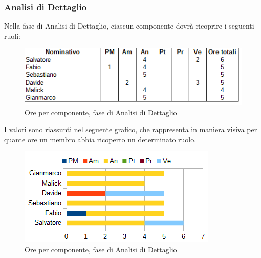 		\subsubsection{Analisi di Dettaglio}
		Nella fase di Analisi di Dettaglio, ciascun componente dovrà ricoprire i seguenti ruoli: \\
		\begin{figure}[H]
			\centering
			\includegraphics[scale=0.75]{immagini/tabelle/analisi_dettaglio.png}
			\caption{Ore per componente, fase di Analisi di Dettaglio}
		\end{figure}
		I valori sono riassunti nel seguente grafico, che rappresenta in maniera visiva per quante ore un membro abbia ricoperto un determinato ruolo. \\
		\begin{figure}[H]
			\centering
			\includegraphics[scale=1]{immagini/grafici/analisi_dettaglio-barra.png}
			\caption{Ore per componente, fase di Analisi di Dettaglio}
		\end{figure}
